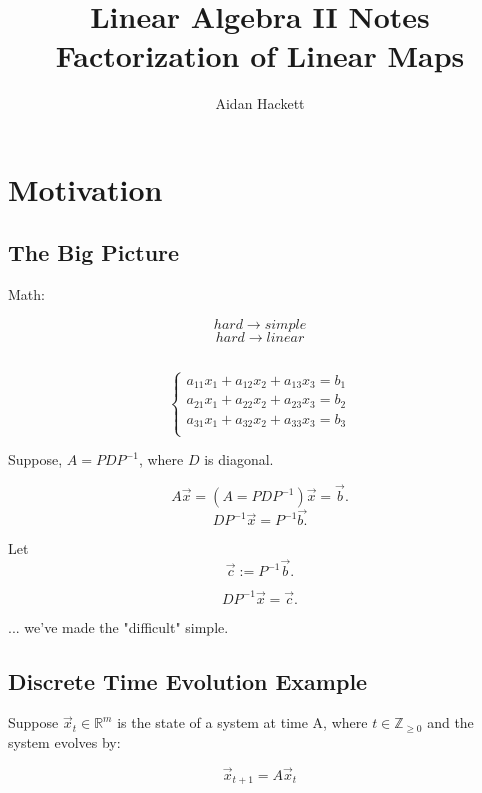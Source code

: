 \documentclass[a4paper,10pt]{article}
\theoremstyle{definition}
\begin{document}
\title{Linear Algebra II Notes \\
\Large{Factorization of Linear Maps}}
\author{Aidan Hackett}
\maketitle

\section{Motivation}

\subsection{The Big Picture}
Math:

$$hard \longrightarrow simple$$
$$hard \longrightarrow linear$$

\subsection{}
\begin{equation}
	\left\{ \begin{aligned} 
		a_{11}x_{1} + a_{12}x_{2} + a_{13}x_{3} = b_{1} \\
		a_{21}x_{1} + a_{22}x_{2} + a_{23}x_{3} = b_{2} \\
		a_{31}x_{1} + a_{32}x_{2} + a_{33}x_{3} = b_{3} \\
	\end{aligned} \right.
\end{equation}



Suppose, $A=PDP^{-1}$, where $D$ is diagonal.

$$A\vec{x}=(A=PDP^{-1})\vec{x} = \vec{b}.$$
$$DP^{-1}\vec{x} = P^{-1}\vec{b.}$$

Let $$\vec{c} := P^{-1}\vec{b}.$$

$$DP^{-1}\vec{x} = \vec{c}.$$

... we've made the "difficult" simple.

\subsection{Discrete Time Evolution Example}

Suppose $\vec{x}_t \in \mathbb{R}^m$ is the state of a system at time A, where $t\in\mathbb{Z}_{\geq 0}$ and the system evolves by:

$$ \vec{x}_{t+1} = A\vec{x}_t$$
\end{document}
